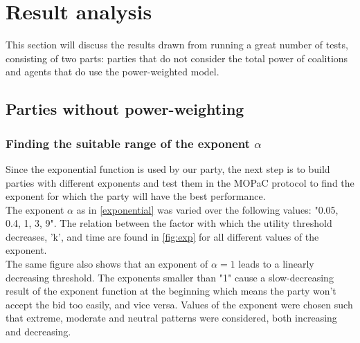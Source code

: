 \section{Result analysis}
\label{sec:results}

    This section will discuss the results drawn from running a great number of tests, consisting of two parts: parties that do not consider the total power of coalitions and agents that do use the power-weighted model.

    \subsection{Parties without power-weighting}

        \subsubsection[Finding a suitable range of the exponent alpha]{Finding the suitable range of the exponent $\alpha$}
            Since the exponential function is used by our party, the next step is to build parties with different exponents and test them in the MOPaC protocol to find the exponent for which the party will have the best performance. \\

            The exponent $\alpha$ as in \autoref{exponential} was varied over the following values: "0.05, 0.4, 1, 3, 9". The relation between the factor with which the utility threshold decreases, 'k', and time are found in \autoref{fig:exp} for all different values of the exponent. \\

            The same figure also shows that an exponent of $\alpha = 1$ leads to a linearly decreasing threshold. The exponents smaller than "1" cause a slow-decreasing result of the exponent function at the beginning which means the party won't accept the bid too easily, and vice versa. Values of the exponent were chosen such that extreme, moderate and neutral patterns were considered, both increasing and decreasing. \\

